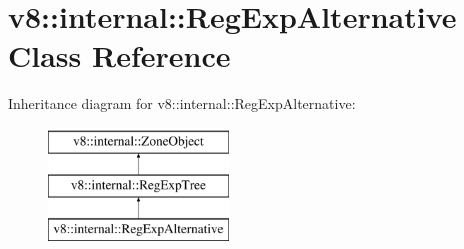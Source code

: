 \hypertarget{classv8_1_1internal_1_1RegExpAlternative}{}\section{v8\+:\+:internal\+:\+:Reg\+Exp\+Alternative Class Reference}
\label{classv8_1_1internal_1_1RegExpAlternative}
Inheritance diagram for v8\+:\+:internal\+:\+:Reg\+Exp\+Alternative\+:\begin{figure}[H]
\begin{center}
\leavevmode
\includegraphics[height=3.000000cm]{classv8_1_1internal_1_1RegExpAlternative}
\end{center}
\end{figure}
